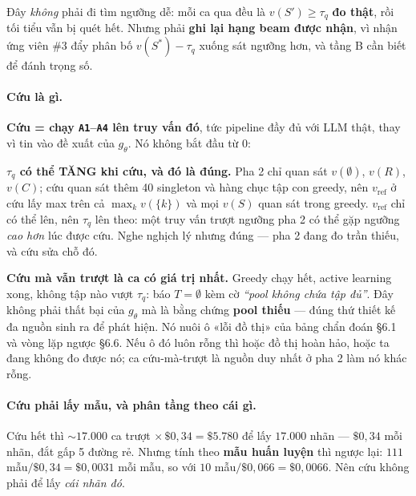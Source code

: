 \documentclass[11pt,a4paper]{article}
\begin{document}
Đây \emph{không} phải đi tìm ngưỡng dễ: mỗi ca qua đều là $v(S')\ge\tau_q$ \textbf{đo thật},
rồi tối tiểu vẫn bị quét hết. Nhưng phải \textbf{ghi lại hạng beam được nhận}, vì nhận ứng
viên \#3 đẩy phân bố $v(S^*)-\tau_q$ xuống sát ngưỡng hơn, và tầng B cần biết để đánh trọng số.

\paragraph{Cứu là gì.} \textbf{Cứu = chạy \texttt{A1}--\texttt{A4} lên truy vấn đó}, tức
pipeline đầy đủ với LLM thật, thay vì tin vào đề xuất của $g_\theta$. Nó không bắt đầu từ 0:


\textbf{$\tau_q$ có thể TĂNG khi cứu, và đó là đúng.} Pha 2 chỉ quan sát $v(\emptyset)$,
$v(R)$, $v(C)$; cứu quan sát thêm 40 singleton và hàng chục tập con greedy, nên
$v_{}$ ở cứu lấy max trên cả $\max_k v(\{k\})$ và mọi $v(S)$ quan sát trong greedy.
$v_{}$ chỉ có thể lên, nên $\tau_q$ lên theo: một truy vấn trượt ngưỡng pha 2 có thể
gặp ngưỡng \emph{cao hơn} lúc được cứu. Nghe nghịch lý nhưng đúng --- pha 2 đang đo trần
thiếu, và cứu sửa chỗ đó.

\textbf{Cứu mà vẫn trượt là ca có giá trị nhất.} Greedy chạy hết, active learning xong, không
tập nào vượt $\tau_q$: báo $T=\emptyset$ kèm cờ \emph{``pool không chứa tập đủ''}. Đây không
phải thất bại của $g_\theta$ mà là bằng chứng \textbf{pool thiếu} --- đúng thứ thiết kế đa
nguồn sinh ra để phát hiện. Nó nuôi ô «lỗi đồ thị» của bảng chẩn đoán \S6.1 và vòng lặp ngược
\S6.6. Nếu ô đó luôn rỗng thì hoặc đồ thị hoàn hảo, hoặc ta đang không đo được nó; ca
cứu-mà-trượt là nguồn duy nhất ở pha 2 làm nó khác rỗng.

\paragraph{Cứu phải lấy mẫu, và phân tầng theo cái gì.} Cứu hết thì ${\sim}17.000$ ca trượt
$\times\,\$0{,}34=\$5.780$ để lấy $17.000$ nhãn --- $\$0{,}34$ mỗi nhãn, đắt gấp 5 đường rẻ.
Nhưng tính theo \textbf{mẫu huấn luyện} thì ngược lại: $111$ mẫu$/\$0{,}34=\$0{,}0031$ mỗi
mẫu, so với $10$ mẫu$/\$0{,}066=\$0{,}0066$. Nên cứu không phải để lấy \emph{cái nhãn đó}.
\end{document}
